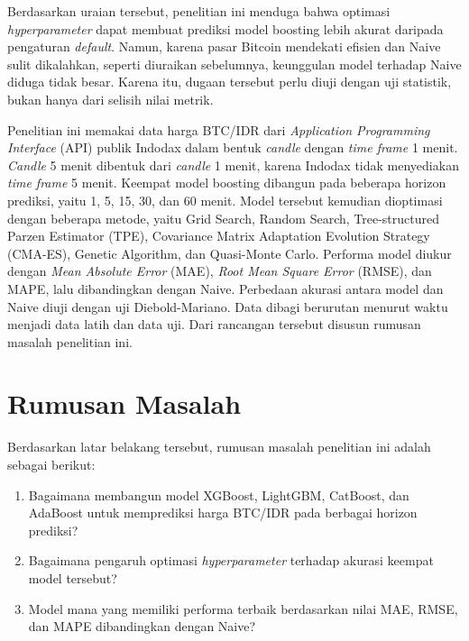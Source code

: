 Berdasarkan uraian tersebut, penelitian ini menduga bahwa optimasi
\textit{hyperparameter} dapat membuat prediksi model boosting lebih akurat
daripada pengaturan \textit{default}. Namun, karena pasar Bitcoin mendekati
efisien dan Naive sulit dikalahkan, seperti diuraikan sebelumnya, keunggulan
model terhadap Naive diduga tidak besar. Karena itu,
dugaan tersebut perlu diuji dengan uji statistik, bukan hanya dari selisih
nilai metrik.

Penelitian ini memakai data harga BTC/IDR dari \textit{Application Programming Interface} (API) publik Indodax dalam bentuk
\textit{candle} dengan \textit{time frame} 1 menit. \textit{Candle} 5 menit
dibentuk dari \textit{candle} 1 menit, karena Indodax tidak menyediakan
\textit{time frame} 5 menit. Keempat model boosting dibangun pada beberapa
horizon prediksi, yaitu 1, 5, 15, 30, dan 60 menit. Model tersebut kemudian dioptimasi dengan beberapa metode, yaitu
Grid Search, Random Search, Tree-structured Parzen Estimator (TPE), Covariance Matrix Adaptation
Evolution Strategy (CMA-ES), Genetic
Algorithm, dan Quasi-Monte Carlo. Performa model diukur dengan \textit{Mean Absolute Error} (MAE),
\textit{Root Mean Square Error} (RMSE), dan MAPE, lalu dibandingkan dengan
Naive. Perbedaan akurasi antara model dan Naive diuji dengan uji
Diebold-Mariano. Data dibagi berurutan menurut waktu menjadi data latih
dan data uji.
Dari rancangan tersebut disusun rumusan masalah penelitian ini.

\section{Rumusan Masalah}
\label{sec:rumusan}
Berdasarkan latar belakang tersebut, rumusan masalah penelitian ini adalah
sebagai berikut:
\begin{enumerate}
  \item\label{rm:1} Bagaimana membangun model XGBoost, LightGBM, CatBoost,
        dan AdaBoost untuk memprediksi harga BTC/IDR pada berbagai
        horizon prediksi?
  \item\label{rm:2} Bagaimana pengaruh optimasi \textit{hyperparameter}
        terhadap akurasi keempat model tersebut?
  \item\label{rm:3} Model mana yang memiliki performa terbaik berdasarkan
        nilai MAE, RMSE, dan MAPE dibandingkan dengan Naive?
\end{enumerate}

